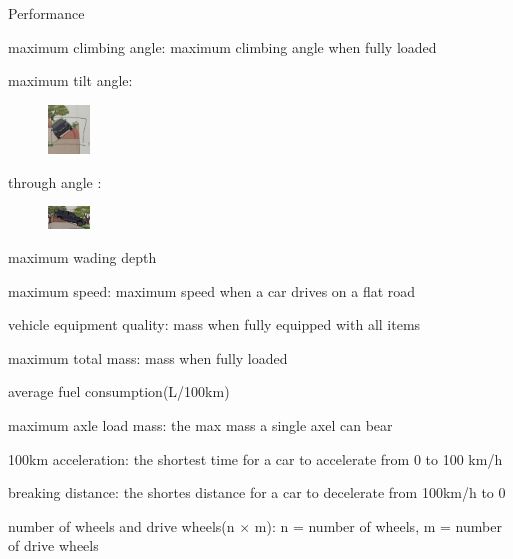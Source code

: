 \begin{frame}
	\begin{block}{Performance}
		\begin{compactitem}
			\item maximum climbing angle: maximum climbing angle when fully loaded
			\item maximum tilt angle:
				\begin{figure}[htbp]
					\centering
					\includegraphics[width=0.1\textwidth]{1-4}
				\end{figure}
			\item  through angle :
				\begin{figure}[htbp]
					\centering
					\includegraphics[width=0.1\textwidth]{1-5}
				\end{figure}
			\item maximum wading depth
			\item maximum speed: maximum speed when a car drives on a flat road
			\item vehicle equipment quality: mass when fully equipped with all items
			\item maximum total mass: mass when fully loaded
			\item average fuel consumption(L/100km)
		\end{compactitem}
	\end{block}
\end{frame}
\begin{frame}
	\begin{block}{}
		\begin{compactitem}
			\item maximum axle load mass: the max mass a single axel can bear
			\item 100km acceleration: the shortest time for a car to accelerate from 0 to 100 km/h
			\item breaking distance: the shortes distance for a car to decelerate from 100km/h to 0
			\item number of wheels and drive wheels(n $\times$ m): n = number of wheels, m = number of drive wheels
		\end{compactitem}
	\end{block}
\end{frame}
